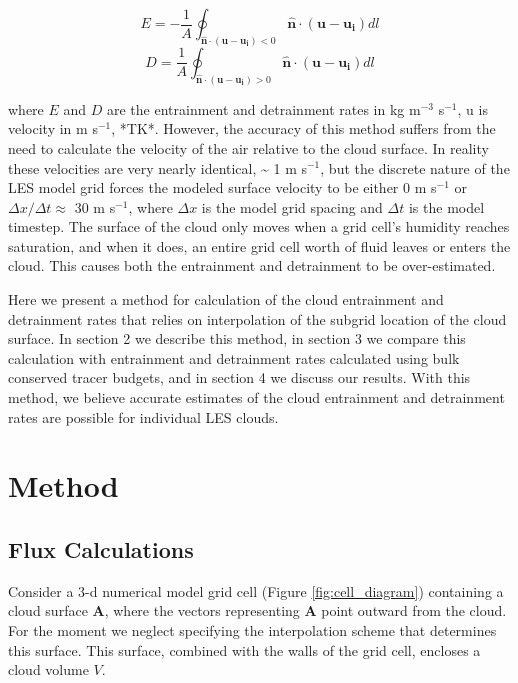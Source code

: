 \documentclass[12pt]{article}
\begin{document}
\begin{equation}
E = -\frac{1}{A}\oint_{\mathbf{\hat{n}}\cdot(\mathbf{u} - \mathbf{u_i}) < 0}
\mathbf{\hat{n}}\cdot(\mathbf{u}-\mathbf{u_i})dl
\end{equation}
\begin{equation}
D = \frac{1}{A}\oint_{\mathbf{\hat{n}}\cdot(\mathbf{u} - \mathbf{u_i}) > 0}
\mathbf{\hat{n}}\cdot(\mathbf{u}-\mathbf{u_i})dl
\end{equation}

where $E$ and $D$ are the entrainment and detrainment rates in kg 
m$^{-3}$ s$^{-1}$, u is velocity in m s$^{-1}$, *TK*.  However, the
accuracy of this method suffers from the need to calculate the velocity 
of the air relative to the cloud surface.  In reality 
these velocities are very nearly identical, \textasciitilde{} 1 m 
s$^{-1}$, but the discrete nature of the LES model grid forces the 
modeled surface velocity to be either 0 m s$^{-1}$ or $\Delta x / \Delta t 
\approx$ 30 m s$^{-1}$, where $\Delta x$ is the model grid spacing and 
$\Delta t$ is the model timestep.  The surface of the cloud only moves 
when a grid cell's humidity reaches saturation, and when it 
does, an entire grid cell worth of fluid leaves or enters the cloud.  This 
causes both the entrainment and detrainment to be over-estimated.

Here we present a method for calculation of the cloud entrainment and 
detrainment rates that relies on interpolation of the subgrid location 
of the cloud surface.  In section 2 we describe this method, in section 
3 we compare this calculation with entrainment and detrainment rates 
calculated using bulk conserved tracer budgets, and in section 4 we 
discuss our results.  With this method, we believe accurate estimates 
of the cloud entrainment and detrainment rates are possible for 
individual LES clouds.


\section{Method}

\subsection{Flux Calculations}

Consider a 3-d numerical model grid cell (Figure \ref{fig:cell_diagram}) 
containing a cloud surface $\mathbf{A}$, where the vectors representing 
$\mathbf{A}$ point outward from the cloud.  For the moment we neglect 
specifying the interpolation scheme that determines this surface.  This 
surface, combined with the walls of the grid cell, encloses a cloud volume $V$.
\end{document}
